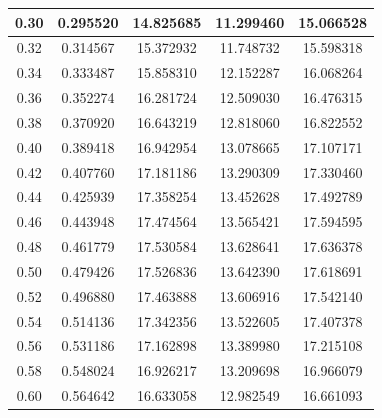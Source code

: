 \documentclass[aps,amsmath,amssymb,floatfix]{revtex4}
\begin{document}
\begin{enumerate}
\begin{enumerate}
\begin{table}[H]
\begin{tabular}{|c|c|c|c|c|}
	      	      		0.30         & 0.295520            & 14.825685           & 11.299460           & 15.066528           \\ \hline
	      	      		0.32         & 0.314567            & 15.372932           & 11.748732           & 15.598318           \\ \hline
	      	      		0.34         & 0.333487            & 15.858310           & 12.152287           & 16.068264           \\ \hline
	      	      		0.36         & 0.352274            & 16.281724           & 12.509030           & 16.476315           \\ \hline
	      	      		0.38         & 0.370920            & 16.643219           & 12.818060           & 16.822552           \\ \hline
	      	      		0.40         & 0.389418            & 16.942954           & 13.078665           & 17.107171           \\ \hline
	      	      		0.42         & 0.407760            & 17.181186           & 13.290309           & 17.330460           \\ \hline
	      	      		0.44         & 0.425939            & 17.358254           & 13.452628           & 17.492789           \\ \hline
	      	      		0.46         & 0.443948            & 17.474564           & 13.565421           & 17.594595           \\ \hline
	      	      		0.48         & 0.461779            & 17.530584           & 13.628641           & 17.636378           \\ \hline
	      	      		0.50         & 0.479426            & 17.526836           & 13.642390           & 17.618691           \\ \hline
	      	      		0.52         & 0.496880            & 17.463888           & 13.606916           & 17.542140           \\ \hline
	      	      		0.54         & 0.514136            & 17.342356           & 13.522605           & 17.407378           \\ \hline
	      	      		0.56         & 0.531186            & 17.162898           & 13.389980           & 17.215108           \\ \hline
	      	      		0.58         & 0.548024            & 16.926217           & 13.209698           & 16.966079           \\ \hline
	      	      		0.60         & 0.564642            & 16.633058           & 12.982549           & 16.661093           \\ \hline

\end{tabular}
\end{table}
\end{enumerate}
\end{enumerate}
\end{document}
